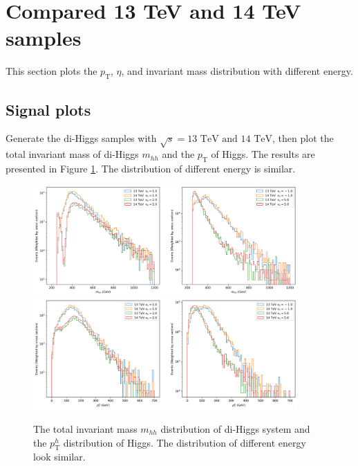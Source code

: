 \documentclass[12pt]{article}
\begin{document}
\section{Compared 13 TeV and 14 TeV samples}%
\label{sec:compared_13_tev_and_14_tev_samples}
	This section plots the $p_\text{T}$, $\eta$, and invariant mass distribution with different energy.
	\subsection{Signal plots}%
	\label{sub:signal_plots}
		Generate the di-Higgs samples with $\sqrt{s} = \text{13 TeV and 14 TeV}$, then plot the total invariant mass of di-Higgs $m_{hh}$ and the $p_{\text{T}}$ of Higgs. The results are presented in Figure \ref{fig:di-Higgs-SM-kappa-13-14TeV}. The distribution of different energy is similar.

		\begin{figure}[htpb]
			\centering
			\includegraphics[width=0.9\textwidth]{di-Higgs-SM-kappa-mhh-13-14TeV.png}
			\includegraphics[width=0.9\textwidth]{di-Higgs-SM-kappa-pth-13-14TeV.png}
			\caption{The total invariant mass $m_{hh}$ distribution of di-Higgs system and the $p_{\text{T}}^{h}$ distribution of Higgs. The distribution of different energy look similar.}
			\label{fig:di-Higgs-SM-kappa-13-14TeV}
		\end{figure}
\end{document}
